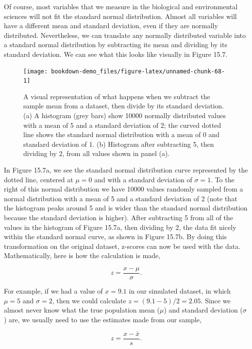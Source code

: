 \documentclass[
]{scrbook}
\begin{document}
Of course, most variables that we measure in the biological and environmental sciences will not fit the standard normal distribution.
Almost all variables will have a different mean and standard deviation, even if they are normally distributed.
Nevertheless, we can translate any normally distributed variable into a standard normal distribution by subtracting its mean and dividing by its standard deviation.
We can see what this looks like visually in Figure 15.7.

\begin{figure}
\texttt{[image: bookdown-demo\_files/figure-latex/unnamed-chunk-68-1]} \caption{A visual representation of what happens when we subtract the sample mean from a dataset, then divide by its standard deviation. (a) A histogram (grey bars) show 10000 normally distributed values with a mean of 5 and a standard deviation of 2; the curved dotted line shows the standard normal distribution with a mean of 0 and standard deviation of 1. (b) Histogram after subtracting 5, then dividing by 2, from all values shown in panel (a).}\label{fig:unnamed-chunk-68}
\end{figure}

In Figure 15.7a, we see the standard normal distribution curve represented by the dotted line, centered at \(\mu = 0\) and with a standard deviation of \(\sigma = 1\).
To the right of this normal distribution we have 10000 values randomly sampled from a normal distribution with a mean of 5 and a standard deviation of 2 (note that the histogram peaks around 5 and is wider than the standard normal distribution because the standard deviation is higher).
After subtracting 5 from all of the values in the histogram of Figure 15.7a, then dividing by 2, the data fit nicely within the standard normal curve, as shown in Figure 15.7b.
By doing this transformation on the original dataset, z-scores can now be used with the data.
Mathematically, here is how the calculation is made,

\[z = \frac{x - \mu}{\sigma}.\]

For example, if we had a value of \(x = 9.1\) in our simulated dataset, in which \(\mu = 5\) and \(\sigma = 2\), then we could calculate \(z = (9.1 - 5) / 2 = 2.05\).
Since we almost never know what the true population mean (\(\mu\)) and standard deviation (\(\sigma\)) are, we usually need to use the estimates made from our sample,

\[z = \frac{x - \bar{x}}{s}.\]
\end{document}
